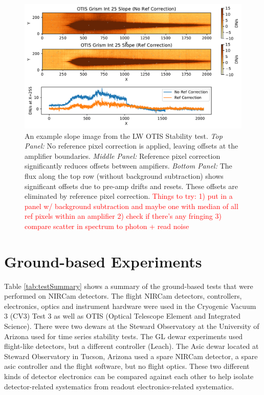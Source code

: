 \documentclass{aastex62}
\begin{document}
\begin{figure}[!hbtp]
\centering
\includegraphics[width=.99\columnwidth]{amplifier_offsets_in_otis_lw_grism.pdf}
\caption{An example slope image from the LW OTIS Stability test.
{\it Top Panel:} No reference pixel correction is applied, leaving offsets at the amplifier boundaries.
{\it Middle Panel:} Reference pixel correction significantly reduces offsets between ampifiers.
{\it Bottom Panel:} The flux along the top row (without background subtraction) shows significant offsets due to pre-amp drifts and resets. These offsets are eliminated by reference pixel correction.
\textcolor{red}{Things to try: 1) put in a panel w/ background subtraction and maybe one with median of all ref pixels within an amplifier 2) check if there's any fringing 3) compare scatter in spectrum to photon + read noise}
}\label{fig:ampOffsetsOtisGrismSlope}
\end{figure}



\section{Ground-based Experiments}\label{sec:experiments}

Table \ref{tab:testSummary} shows a summary of the ground-based tests that were performed on NIRCam detectors.
The flight NIRCam detectors, controllers, electronics, optics and instrument hardware were used in the Cryogenic Vacuum 3 (CV3) Test 3 as well as OTIS (Optical Telescope Element and Integrated Science).
There were two dewars at the Steward Observatory at the University of Arizona used for time series stability tests.
The GL dewar experiments used flight-like detectors, but a different controller (Leach).
The Asic dewar located at Steward Observatory in Tucson, Arizona used a spare NIRCam detector, a spare asic controller and the flight software, but no flight optics.
These two different kinds of detector electronics can be compared against each other to help isolate detector-related systematics from readout electronics-related systematics.
\end{document}
